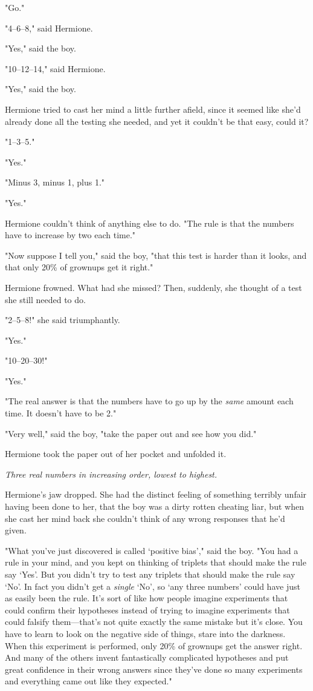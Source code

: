 "Go."

"4--6--8," said Hermione.

"Yes," said the boy.

"10--12--14," said Hermione.

"Yes," said the boy.

Hermione tried to cast her mind a little further afield, since it seemed like
she'd already done all the testing she needed, and yet it couldn't be that
easy, could it?

"1--3--5."

"Yes."

"Minus 3, minus 1, plus 1."

"Yes."

Hermione couldn't think of anything else to do. "The rule is that the numbers
have to increase by two each time."

"Now suppose I tell you," said the boy, "that this test is harder than it
looks, and that only 20\% of grownups get it right."

Hermione frowned. What had she missed? Then, suddenly, she thought of a test
she still needed to do.

"2--5--8!" she said triumphantly.

"Yes."

"10--20--30!"

"Yes."

"The real answer is that the numbers have to go up by the \emph{same} amount
each time. It doesn't have to be 2."

"Very well," said the boy, "take the paper out and see how you did."

Hermione took the paper out of her pocket and unfolded it.

\emph{Three real numbers in increasing order, lowest to highest.}

Hermione's jaw dropped. She had the distinct feeling of something terribly
unfair having been done to her, that the boy was a dirty rotten cheating liar,
but when she cast her mind back she couldn't think of any wrong responses that
he'd given.

"What you've just discovered is called `positive bias'," said the boy. "You had
a rule in your mind, and you kept on thinking of triplets that should make the
rule say `Yes'. But you didn't try to test any triplets that should make the
rule say `No'. In fact you didn't get a \emph{single} `No', so `any three
numbers' could have just as easily been the rule. It's sort of like how people
imagine experiments that could confirm their hypotheses instead of trying to
imagine experiments that could falsify them---that's not quite exactly the same
mistake but it's close. You have to learn to look on the negative side of
things, stare into the darkness. When this experiment is performed, only 20\% of
grownups get the answer right. And many of the others invent fantastically
complicated hypotheses and put great confidence in their wrong answers since
they've done so many experiments and everything came out like they expected."

